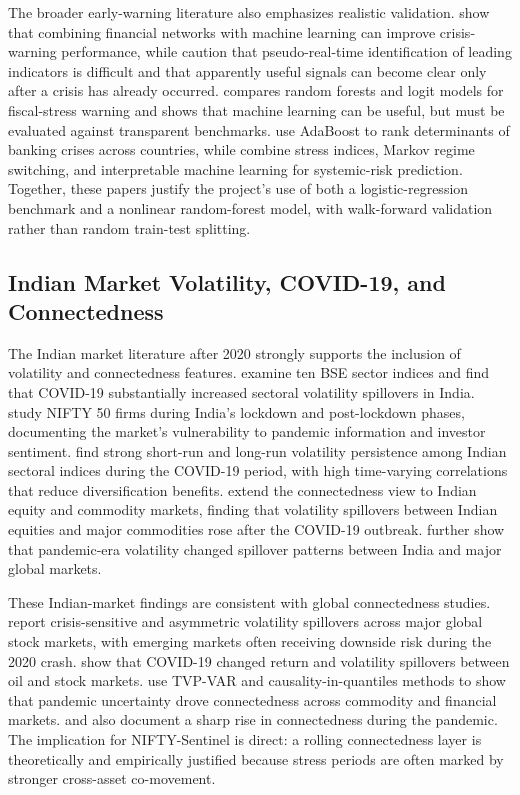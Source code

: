 \documentclass[12pt,a4paper]{article}
\begin{document}
The broader early-warning literature also emphasizes realistic validation. \citet{samitas2020ml} show that combining financial networks with machine learning can improve crisis-warning performance, while \citet{duprey2022early} caution that pseudo-real-time identification of leading indicators is difficult and that apparently useful signals can become clear only after a crisis has already occurred. \citet{jarmulska2022rf} compares random forests and logit models for fiscal-stress warning and shows that machine learning can be useful, but must be evaluated against transparent benchmarks. \citet{genberg2022banking} use AdaBoost to rank determinants of banking crises across countries, while \citet{tang2024systemic} combine stress indices, Markov regime switching, and interpretable machine learning for systemic-risk prediction. Together, these papers justify the project's use of both a logistic-regression benchmark and a nonlinear random-forest model, with walk-forward validation rather than random train-test splitting.

\subsection{Indian Market Volatility, COVID-19, and Connectedness}

The Indian market literature after 2020 strongly supports the inclusion of volatility and connectedness features. \citet{guru2021covid} examine ten BSE sector indices and find that COVID-19 substantially increased sectoral volatility spillovers in India. \citet{rao2021vulnerability} study NIFTY 50 firms during India's lockdown and post-lockdown phases, documenting the market's vulnerability to pandemic information and investor sentiment. \citet{sahoo2023sectoral} find strong short-run and long-run volatility persistence among Indian sectoral indices during the COVID-19 period, with high time-varying correlations that reduce diversification benefits. \citet{eap2023indiaCommodity} extend the connectedness view to Indian equity and commodity markets, finding that volatility spillovers between Indian equities and major commodities rose after the COVID-19 outbreak. \citet{jrfm2024indiaSpillover} further show that pandemic-era volatility changed spillover patterns between India and major global markets.

These Indian-market findings are consistent with global connectedness studies. \citet{li2021asymmetric} report crisis-sensitive and asymmetric volatility spillovers across major global stock markets, with emerging markets often receiving downside risk during the 2020 crash. \citet{zhang2021oilstock} show that COVID-19 changed return and volatility spillovers between oil and stock markets. \citet{adekoya2021covidconnected} use TVP-VAR and causality-in-quantiles methods to show that pandemic uncertainty drove connectedness across commodity and financial markets. \citet{naeem2021covid} and \citet{sectoral2022us} also document a sharp rise in connectedness during the pandemic. The implication for NIFTY-Sentinel is direct: a rolling connectedness layer is theoretically and empirically justified because stress periods are often marked by stronger cross-asset co-movement.
\end{document}
